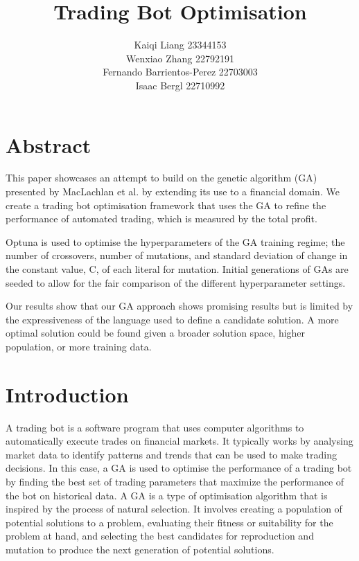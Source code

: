 \documentclass{IEEEtran}
\begin{document}
\title{Trading Bot Optimisation}
\author{Kaiqi Liang 23344153\\Wenxiao Zhang 22792191\\Fernando Barrientos-Perez 22703003\\Isaac Bergl 22710992}
\maketitle

\section{Abstract}
This paper showcases an attempt to build on the genetic algorithm (GA) presented by MacLachlan et al. \cite{maclachlan2022genetic} by extending its use to a financial domain. We create a trading bot optimisation framework that uses the GA to refine the performance of automated trading, which is measured by the total profit.

Optuna is used to optimise the hyperparameters of the GA training regime; the number of crossovers, number of mutations, and standard deviation of change in the constant value, C, of each literal for mutation. Initial generations of GAs are seeded to allow for the fair comparison of the different hyperparameter settings. 

Our results show that our GA approach shows promising results but is limited by the expressiveness of the language used to define a candidate solution. A more optimal solution could be found given a broader solution space, higher population, or more training data.

\section{Introduction}
A trading bot is a software program that uses computer algorithms to automatically execute trades on financial markets. It typically works by analysing market data to identify patterns and trends that can be used to make trading decisions. In this case, a GA is used to optimise the performance of a trading bot by finding the best set of trading parameters that maximize the performance of the bot on historical data. A GA is a type of optimisation algorithm that is inspired by the process of natural selection. It involves creating a population of potential solutions to a problem, evaluating their fitness or suitability for the problem at hand, and selecting the best candidates for reproduction and mutation to produce the next generation of potential solutions. 
\end{document}
